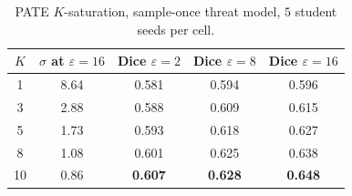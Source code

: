 \begin{table}[t]
\centering
\small
\caption{PATE $K$-saturation, sample-once threat model,
$5$ student seeds per cell.}
\label{tab:ksat}
\begin{tabular}{c c c c c}
\toprule
$K$ & $\sigma$ at $\varepsilon{=}16$ & Dice $\varepsilon{=}2$ & Dice $\varepsilon{=}8$ & Dice $\varepsilon{=}16$ \\
\midrule
1   & 8.64 & 0.581 & 0.594 & 0.596 \\
3   & 2.88 & 0.588 & 0.609 & 0.615 \\
5   & 1.73 & 0.593 & 0.618 & 0.627 \\
8   & 1.08 & 0.601 & 0.625 & 0.638 \\
10  & 0.86 & \textbf{0.607} & \textbf{0.628} & \textbf{0.648} \\
\bottomrule
\end{tabular}
\end{table}

%
